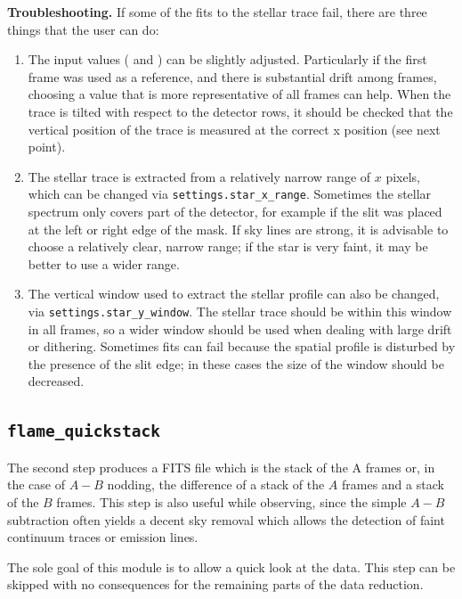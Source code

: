 \documentclass[a4paper]{article}
\begin{document}
\begin{sloppypar}
\medskip
\noindent
\textbf{Troubleshooting.} If some of the fits to the stellar trace fail, there are three things that the user can do:
\begin{enumerate}
\item The input values ( and ) can be slightly adjusted. Particularly if the first frame was used as a reference, and there is substantial drift among frames, choosing a value that is more representative of all frames can help. When the trace is tilted with respect to the detector rows, it should be checked that the vertical position of the trace is measured at the correct x position (see next point).
\item The stellar trace is extracted from a relatively narrow range of $x$ pixels, which can be changed via \texttt{settings.star\_x\_range}. Sometimes the stellar spectrum only covers part of the detector, for example if the slit was placed at the left or right edge of the mask. If sky lines are strong, it is advisable to choose a relatively clear, narrow range; if the star is very faint, it may be better to use a wider range.
\item The vertical window used to extract the stellar profile can also be changed, via \texttt{settings.star\_y\_window}. The stellar trace should be within this window in all frames, so a wider window should be used when dealing with large drift or dithering. Sometimes fits can fail because the spatial profile is disturbed by the presence of the slit edge; in these cases the size of the window should be decreased.
\end{enumerate}


\subsection{\texttt{flame\_quickstack}}
\label{sec:quickstack}

The second step produces a FITS file which is the stack of the A frames or, in the case of $A-B$ nodding, the difference of a stack of the $A$ frames and a stack of the $B$ frames. This step is also useful while observing, since the simple $A-B$ subtraction often yields a decent sky removal which allows the detection of faint continuum traces or emission lines.

The sole goal of this module is to allow a quick look at the data. This step can be skipped with no consequences for the remaining parts of the data reduction.


\end{sloppypar}
\end{document}
